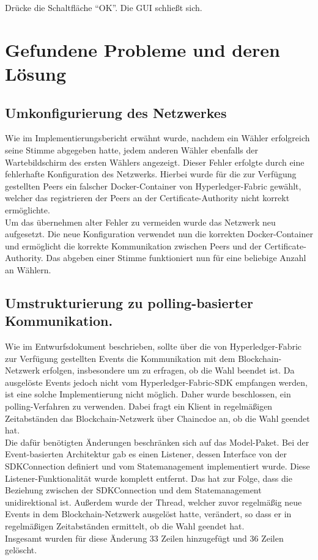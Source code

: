 \documentclass[parskip=full]{scrartcl}
\begin{document}
\teststep{}
		{Drücke die Schaltfläche \enquote{OK}.}
		{Die GUI schließt sich.}

\section{Gefundene Probleme und deren Lösung}
\subsection{Umkonfigurierung des Netzwerkes}
Wie im Implementierungsbericht erwähnt wurde, nachdem ein Wähler erfolgreich seine Stimme abgegeben hatte, jedem anderen Wähler ebenfalls der Wartebildschirm des ersten Wählers angezeigt. Dieser Fehler erfolgte durch eine fehlerhafte Konfiguration des Netzwerks. Hierbei wurde für die zur Verfügung gestellten Peers ein falscher Docker-Container von Hyperledger-Fabric gewählt, welcher das registrieren der Peers an der Certificate-Authority nicht korrekt ermöglichte.
\\
Um das übernehmen alter Fehler zu vermeiden wurde das Netzwerk neu aufgesetzt. Die neue Konfiguration verwendet nun die korrekten Docker-Container und ermöglicht die korrekte Kommunikation zwischen Peers und der Certificate-Authority. Das abgeben einer Stimme funktioniert nun für eine beliebige Anzahl an Wählern.

\subsection{Umstrukturierung zu polling-basierter Kommunikation.}
Wie im Entwurfsdokument beschrieben, sollte über die von Hyperledger-Fabric zur Verfügung gestellten Events die Kommunikation mit dem Blockchain-Netzwerk erfolgen, insbesondere um zu erfragen, ob die Wahl beendet ist. Da ausgelöste Events jedoch nicht vom Hyperledger-Fabric-SDK empfangen werden, ist eine solche Implementierung nicht möglich. Daher wurde beschlossen, ein polling-Verfahren zu verwenden. Dabei fragt ein Klient in regelmäßigen Zeitabständen das Blockchain-Netzwerk über Chaincdoe an, ob die Wahl geendet hat.
\\
Die dafür benötigten Änderungen beschränken sich auf das Model-Paket. Bei der Event-basierten Architektur gab es einen Listener, dessen Interface von der SDKConnection definiert und vom Statemanagement implementiert wurde. Diese Listener-Funktionalität wurde komplett entfernt. Das hat zur Folge, dass die Beziehung zwischen der SDKConnection und dem Statemanagement unidirektional ist. Außerdem wurde der Thread, welcher zuvor regelmäßig neue Events in dem Blockchain-Netzwerk ausgelöst hatte, verändert, so dass er in regelmäßigen Zeitabständen ermittelt, ob die Wahl geendet hat.
\\
Insgesamt wurden für diese Änderung 33 Zeilen hinzugefügt und 36 Zeilen gelöscht.
\end{document}
